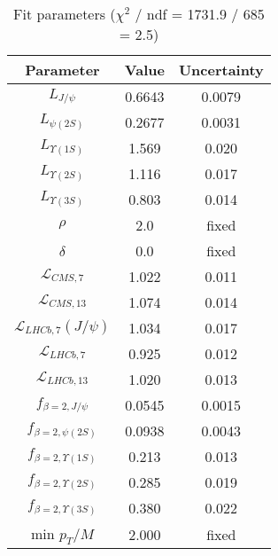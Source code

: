 \begin{table}[h!]
\centering
\begin{tabular}{c|c|c}
Parameter & Value & Uncertainty \\
\hline
$L_{J/\psi}$ & 0.6643 & 0.0079 \\
$L_{\psi(2S)}$ & 0.2677 & 0.0031 \\
$L_{\Upsilon(1S)}$ & 1.569 & 0.020 \\
$L_{\Upsilon(2S)}$ & 1.116 & 0.017 \\
$L_{\Upsilon(3S)}$ & 0.803 & 0.014 \\
$\rho$ & 2.0 & fixed \\
$\delta$ & 0.0 & fixed \\
$\mathcal L_{CMS,7}$ & 1.022 & 0.011 \\
$\mathcal L_{CMS,13}$ & 1.074 & 0.014 \\
$\mathcal L_{LHCb,7}(J/\psi)$ & 1.034 & 0.017 \\
$\mathcal L_{LHCb,7}$ & 0.925 & 0.012 \\
$\mathcal L_{LHCb,13}$ & 1.020 & 0.013 \\
$f_{\beta=2,J/\psi}$ & 0.0545 & 0.0015 \\
$f_{\beta=2,\psi(2S)}$ & 0.0938 & 0.0043 \\
$f_{\beta=2,\Upsilon(1S)}$ & 0.213 & 0.013 \\
$f_{\beta=2,\Upsilon(2S)}$ & 0.285 & 0.019 \\
$f_{\beta=2,\Upsilon(3S)}$ & 0.380 & 0.022 \\
min $p_T/M$ & 2.000 & fixed \\
\end{tabular}
\caption{Fit parameters ($\chi^2$ / ndf = 1731.9 / 685 = 2.5)}
\end{table}
